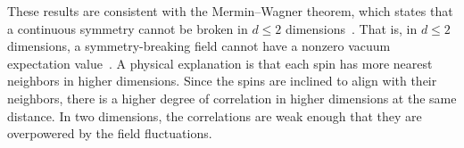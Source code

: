 {	These results are consistent with the Mermin--Wagner theorem, which states that a continuous symmetry cannot be broken in $d \leq 2$ dimensions~\cite{CMW}.  That is, in $d \leq 2$ dimensions, a symmetry-breaking field cannot have a nonzero vacuum expectation value~\cite[p.~460]{Peskin}.  A physical explanation is that each spin has more nearest neighbors in higher dimensions.  Since the spins are inclined to align with their neighbors, there is a higher degree of correlation in higher dimensions at the same distance.  In two dimensions, the correlations are weak enough that they are overpowered by the field fluctuations.
}